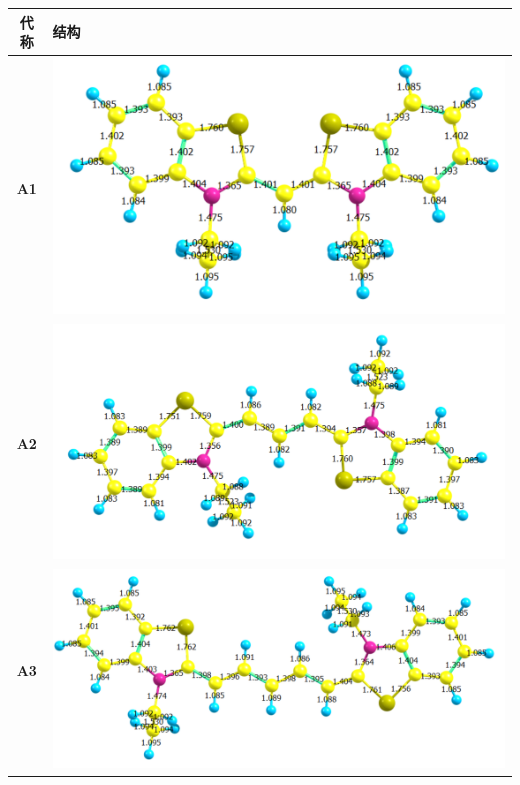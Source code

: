 \begin{table}[H]
    \centering
    \begin{tabular}{cM{15cm}}
    \toprule
    代称 & 结构 \\
    \midrule
    \textbf{A1} & \includegraphics[scale=.43]{figures3/3-1-1.png} \\
    \textbf{A2} & \includegraphics[scale=.43]{figures3/3-1-2.png} \\
    \textbf{A3} & \includegraphics[scale=.43]{figures3/3-1-3.png} \\

\end{tabular}
\end{table}
